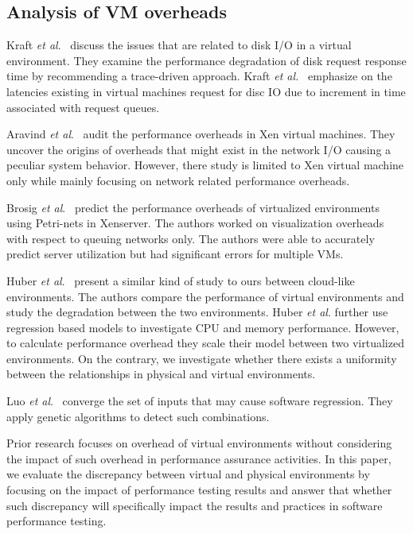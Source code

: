 \subsection{Analysis of VM overheads}

Kraft \textit{et al$.$}~\cite{kraft2011io} discuss the issues that are related to disk I/O in a virtual environment. They examine the performance degradation of disk request response time by recommending a trace-driven approach. Kraft \textit{et al.}~\cite{kraft2011io} emphasize on the latencies existing in virtual machines request for disc IO due to increment in time associated with request queues. 

Aravind \textit{et al$.$}~\cite{menon2005diagnosing} audit the performance overheads in Xen virtual machines. They uncover the origins of overheads that might exist in the network I/O causing a peculiar system behavior. However, there study is limited to Xen virtual machine only while mainly focusing on network related performance overheads.

Brosig \textit{et al$.$}~\cite{brosig2013evaluating} predict the performance overheads of virtualized environments using Petri-nets in Xenserver. The authors worked on visualization overheads with respect to queuing networks only. The authors were able to accurately predict server utilization but had significant errors for multiple VMs.


Huber \textit{et al$.$}~\cite{huber2011evaluating} present a similar kind of study to ours between cloud-like environments. The authors compare the performance of virtual environments and study the degradation between the two environments. Huber \textit{et al$.$} further use regression based models to investigate CPU and memory performance. However, to calculate performance overhead they scale their model between two virtualized environments. On the contrary, we investigate whether there exists a uniformity between the relationships in physical and virtual environments.  


Luo \textit{et al$.$}~\cite{Luo:2016:MPR:2901739.2901765} converge the set of inputs that may cause software regression. They apply genetic algorithms to detect such combinations. 

Prior research focuses on overhead of virtual environments without considering the impact of such overhead in performance assurance activities. In this paper, we evaluate the discrepancy between virtual and physical environments by focusing on the impact of performance testing results and answer that whether such discrepancy will specifically impact the results and practices in software  performance testing.  


